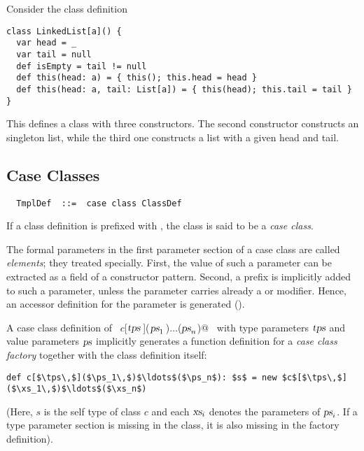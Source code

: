 \example Consider the class definition

\begin{lstlisting}
class LinkedList[a]() {
  var head = _ 
  var tail = null 
  def isEmpty = tail != null   
  def this(head: a) = { this(); this.head = head }
  def this(head: a, tail: List[a]) = { this(head); this.tail = tail }
}
\end{lstlisting}
This defines a class  with three constructors.  The
second constructor constructs an singleton list, while the
third one constructs a list with a given head and tail.

\subsection{Case Classes}
\label{sec:case-classes}

\syntax\begin{lstlisting} 
  TmplDef  ::=  case class ClassDef
\end{lstlisting}

If a class definition is prefixed with , the class is said
to be a {\em case class}.  

The formal parameters in the first parameter section of a case class
are called {\em elements}; they treated
specially. First, the value of such a parameter can be extracted as a
field of a constructor pattern. Second, a  prefix is
implicitly added to such a parameter, unless the parameter carries
already a  or  modifier. Hence, an accessor
definition for the parameter is generated ().

A case class definition of ~\lstinline@$c$[$\mbox{\sl tps}\,$]($\mbox{\sl ps}_1\,$)$\ldots$($\mbox{\sl ps}_n$)@~ with type
parameters $\mbox{\sl tps}$ and value parameters $\mbox{\sl ps}$ implicitly
generates a function definition for a {\em case class factory}
together with the class definition itself:
\begin{lstlisting}
def c[$\tps\,$]($\ps_1\,$)$\ldots$($\ps_n$): $s$ = new $c$[$\tps\,$]($\xs_1\,$)$\ldots$($\xs_n$)
\end{lstlisting}
(Here, $s$ is the self type of class $c$ and each $\mbox{\sl xs}_i$ denotes the
parameters of $\mbox{\sl ps}_i$.  If a type parameter section is missing in the
class, it is also missing in the factory definition).

